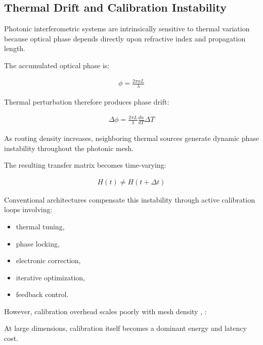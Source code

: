 \documentclass[journal]{IEEEtran}
\begin{document}
\subsection{\textbf{Thermal Drift and Calibration Instability}}

Photonic interferometric systems are intrinsically sensitive to thermal variation because optical phase depends directly upon refractive index and propagation length.

The accumulated optical phase is:

\begin{align}
\phi = \frac{2\pi nL}{\lambda}
\label{eq:phase_equation}
\end{align}

Thermal perturbation therefore produces phase drift:

\begin{align}
\Delta \phi = \frac{2\pi L}{\lambda} \frac{dn}{dT} \Delta T
\label{eq:phase_drift}
\end{align}

As routing density increases, neighboring thermal sources generate dynamic phase instability throughout the photonic mesh.

The resulting transfer matrix becomes time-varying:

\begin{align}
H(t) \neq H(t+\Delta t)
\label{eq:time_variation}
\end{align}

Conventional architectures compensate this instability through active calibration loops involving:

\begin{itemize}
\item thermal tuning,
\item phase locking,
\item electronic correction,
\item iterative optimization,
\item feedback control.
\end{itemize}

However, calibration overhead scales poorly with mesh density \cite{Miller2013}, \cite{Hamerly2022}:

\begin{center}
\label{eq:calibration_scaling}
\end{center}

At large dimensions, calibration itself becomes a dominant energy and latency cost.
\end{document}
